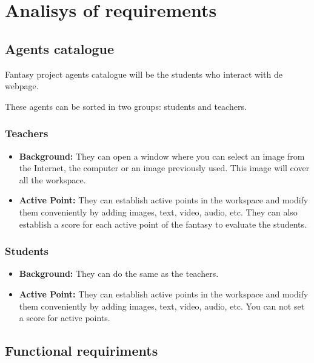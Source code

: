 \chapter{Analisys of requirements}
\section{Agents catalogue}
Fantasy project agents catalogue will be the students who interact with de webpage.

These agents can be sorted in two groups: students and teachers.

\subsection{Teachers}
\begin{itemize}
	\item \textbf{Background:} They can open a window where you can select an image from the Internet, the computer or an image previously used. This image will cover all the workspace.
	\item \textbf{Active Point:} They can establish active points in the workspace and modify them conveniently by adding images, text, video, audio, etc. They can also establish a score for each active point of the fantasy to evaluate the students.
\end{itemize}

\subsection{Students}
\begin{itemize}
	\item \textbf{Background:} They can do the same as the teachers.
	\item \textbf{Active Point:} They can establish active points in the workspace and modify them conveniently by adding images, text, video, audio, etc. You can not set a score for active points.
\end{itemize}

\section{Functional requiriments}

